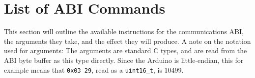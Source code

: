 \newcommand{\abispec}[6]{
\subsection{\texttt{#1}}

\begin{tabularx}{\textwidth}{>{\hsize=.5\hsize}XX}
\textbf{Instruction byte:}               & \texttt{#2} \\
\textbf{Argument bytes:}                 & #3 \\
\textbf{Argument type(s):}               & \texttt{#4} \\
\textbf{Action:}                         & #5 \\
\textbf{Relation to low-level commands:} & #6 \\
\end{tabularx}
}

\section{List of ABI Commands} \label{abi}

This section will outline the available instructions for the communications
ABI, the arguments they take, and the effect they will produce. A note on the
notation used for arguments: The arguments are standard C types, and are read
from the ABI byte buffer as this type directly. Since the Arduino is
little-endian, this for example means that \texttt{0x03 29}, read as a
\texttt{uint16\_t}, is 10499.

